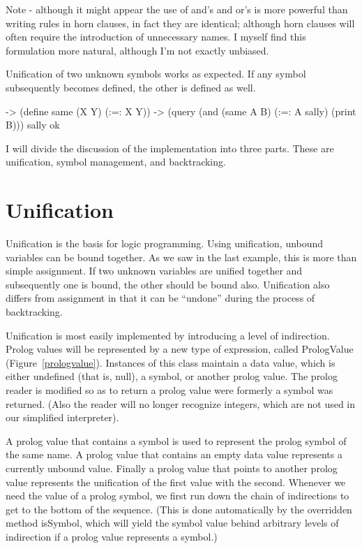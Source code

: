 Note - although it might appear the use of and's and or's is more powerful
than writing rules in horn clauses, in fact they are identical; although
horn clauses will often require the introduction of unnecessary names.
I myself find this formulation more natural, although I'm not exactly
unbiased.

Unification of two unknown symbols works as expected.  If any symbol
subsequently becomes defined, the other is defined as well.
\begin{cprog}
-> (define same (X Y) (:=: X Y))
-> (query (and (same A B) (:=: A sally) (print B)))
sally
ok
\end{cprog}

I will divide the discussion of the implementation into three parts.
These are unification, symbol management, and backtracking.

\section{Unification}

Unification is the basis for logic programming.  Using unification, unbound
variables can be bound together.  As we saw in the last example, this is
more than simple assignment.  If two unknown variables are unified together
and subsequently one is bound, the other should be bound also.
Unification also differs
from assignment in that it can be ``undone'' during the process of backtracking.

Unification is most easily implemented by introducing a level of
indirection.  Prolog values will be represented by a new type of
expression, called {\sf PrologValue} (Figure~\ref{prologvalue}).
Instances of this class maintain a data value, which is either undefined
(that is, null), a symbol, or another prolog value.
The prolog reader is modified so as to return a prolog value were formerly a
symbol was returned.  (Also the reader will no longer recognize integers,
which are not used in our simplified interpreter).

A prolog value that contains a symbol is used to represent the prolog
symbol of the same name.
A prolog value that contains an empty data value represents a currently
unbound value.  Finally a prolog value that points to another prolog value
represents the unification of the first value with the second.
Whenever we need the value of a prolog symbol, we first run down the chain
of indirections to get to the bottom of the sequence.
(This is done automatically by the overridden method {\sf isSymbol}, which
will yield the symbol value behind arbitrary levels of indirection if a
prolog value represents a symbol.)

